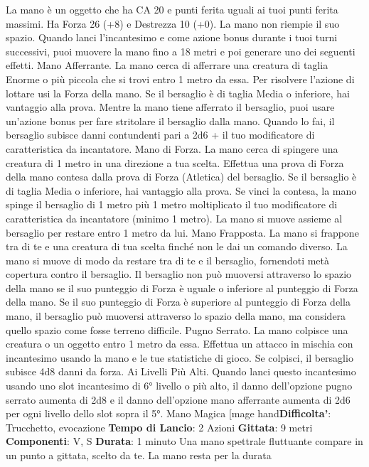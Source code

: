 \begin{multicols}{2}
La mano è un oggetto che ha CA 20 e punti ferita uguali
ai tuoi punti ferita massimi. Ha Forza 26 (+8) e
Destrezza 10 (+0). La mano non riempie il suo spazio.
Quando lanci l’incantesimo e come azione bonus
durante i tuoi turni successivi, puoi muovere la mano
fino a 18 metri e poi generare uno dei seguenti effetti.
Mano Afferrante. La mano cerca di afferrare una
creatura di taglia Enorme o più piccola che si trovi entro 
1 metro da essa. Per risolvere l’azione di lottare usi la
Forza della mano. Se il bersaglio è di taglia Media o
inferiore, hai vantaggio alla prova. Mentre la mano tiene
afferrato il bersaglio, puoi usare un’azione bonus per
fare stritolare il bersaglio dalla mano. Quando lo fai, il
bersaglio subisce danni contundenti pari a 2d6 + il tuo
modificatore di caratteristica da incantatore.
Mano di Forza. La mano cerca di spingere una
creatura di 1 metro in una direzione a tua scelta.
Effettua una prova di Forza della mano contesa dalla
prova di Forza (Atletica) del bersaglio. Se il bersaglio è
di taglia Media o inferiore, hai vantaggio alla prova. Se
vinci la contesa, la mano spinge il bersaglio di 1 metro
più 1 metro moltiplicato il tuo modificatore di
caratteristica da incantatore (minimo 1 metro). La
mano si muove assieme al bersaglio per restare entro
1 metro da lui.
Mano Frapposta. La mano si frappone tra di te e una
creatura di tua scelta finché non le dai un comando
diverso. La mano si muove di modo da restare tra di te
e il bersaglio, fornendoti metà copertura contro il
bersaglio. Il bersaglio non può muoversi attraverso lo
spazio della mano se il suo punteggio di Forza è uguale
o inferiore al punteggio di Forza della mano. Se il suo
punteggio di Forza è superiore al punteggio di Forza
della mano, il bersaglio può muoversi attraverso lo
spazio della mano, ma considera quello spazio come
fosse terreno difficile.
Pugno Serrato. La mano colpisce una creatura o un
oggetto entro 1 metro da essa. Effettua un attacco in
mischia con incantesimo usando la mano e le tue
statistiche di gioco. Se colpisci, il bersaglio subisce 4d8
danni da forza.
Ai Livelli Più Alti. Quando lanci questo incantesimo
usando uno slot incantesimo di 6° livello o più alto, il
danno dell’opzione pugno serrato aumenta di 2d8 e il
danno dell’opzione mano afferrante aumenta di 2d6 per
ogni livello dello slot sopra il 5°.
Mano Magica
[mage hand\textbf{Difficolta'}:
Trucchetto, evocazione
\textbf{Tempo di Lancio}: 2 Azioni
\textbf{Gittata}: 9 metri
\textbf{Componenti}: V, S
\textbf{Durata}: 1 minuto
Una mano spettrale fluttuante compare in un punto a
gittata, scelto da te. La mano resta per la durata

\end{multicols}
